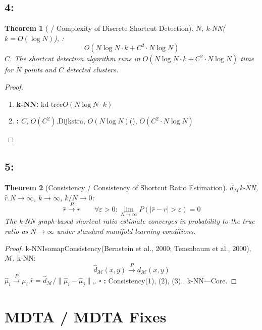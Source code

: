 \documentclass[11pt,a4paper]{article}
\theoremstyle{plain}
\newtheorem{theorem}{Theorem}[section]
\theoremstyle{definition}
\theoremstyle{remark}
\newcommand{\cM}{\mathcal{M}}
\begin{document}
{\subsection{4:}
\begin{theorem}[ / Complexity of Discrete Shortcut Detection]
\label{thm:mdta-complexity}
$N$, k-NN($k = O(\log N)$), : 
\begin{equation}
\boxed{O(N \log N \cdot k + C^2 \cdot N \log N)}
\end{equation}
$C$.
\textit{The shortcut detection algorithm runs in $O(N \log N \cdot k + C^2 \cdot N \log N)$ time for $N$ points and $C$ detected clusters.}
\end{theorem}
\begin{proof}
\begin{enumerate}[leftmargin=*, label=(\arabic*)]
 \item \textbf{k-NN: } kd-tree$O(N \log N \cdot k)$
 \item \textbf{: } $C$, $O(C^2)$.Dijkstra, $O(N \log N)$(), $O(C^2 \cdot N \log N)$
\end{enumerate}
\end{proof}
\subsection{5:}
\begin{theorem}[Consistency / Consistency of Shortcut Ratio Estimation]
\label{thm:mdta-consistency}
$\hat{d}_{\cM}$k-NN, $\hat{r}$.$N \to \infty$, $k \to \infty$, $k/N \to 0$: 
\begin{equation}
\boxed{\hat{r} \xrightarrow{P} r \quad \text{} \quad \forall \varepsilon > 0: \lim_{N \to \infty} P(|\hat{r} - r| > \varepsilon) = 0}
\end{equation}
\textit{The k-NN graph-based shortcut ratio estimate converges in probability to the true ratio as $N \to \infty$ under standard manifold learning conditions.}
\end{theorem}
\begin{proof}
k-NNIsomapConsistency(Bernstein et al., 2000; Tenenbaum et al., 2000), $\cM$, k-NN: 
\begin{equation}
 \hat{d}_{\cM}(x, y) \xrightarrow{P} d_{\cM}(x, y)
\end{equation}
$\hat{\mu}_i \xrightarrow{P} \mu_i$.$\hat{r} = \hat{d}_{\cM} / \|\hat{\mu}_i - \hat{\mu}_j\|$,.
$\square$ \textbf{: } Consistency(1), (2), (3)., k-NN---Core.
\end{proof}
\section{MDTA / MDTA Fixes}
\label{sec:mdta-fixes}
}
\end{document}
